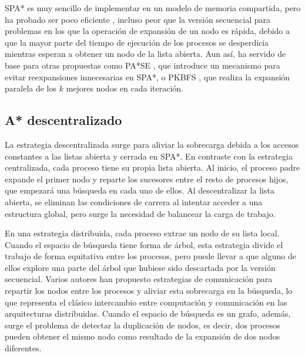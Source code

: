 \documentclass[a4paper,12pt]{article}
\begin{document}
SPA* es muy sencillo de implementar en un modelo de memoria compartida, pero ha probado ser poco eficiente \cite{lai1984anomalies}, incluso peor que la versión secuencial para problemas en los que la operación de expansión de un nodo es rápida, debido a que la mayor parte del tiempo de ejecución de los procesos se desperdicia mientras esperan a obtener un nodo de la lista abierta. Aun así, ha servido de base para otras propuestas como PA*SE \cite{phillips2014pa}, que introduce un mecanismo para evitar reexpansiones innecesarias en SPA*, o PKBFS \cite{vidal2010adaptive}, que realiza la expansión paralela de los $k$ mejores nodos en cada iteración.

\subsection{A* descentralizado} \label{sec:descentralizado}

La estrategia descentralizada surge para aliviar la sobrecarga debida a los accesos constantes a las listas abierta y cerrada en SPA*. En contraste con la estrategia centralizada, cada proceso tiene su propia lista abierta. Al inicio, el proceso padre expande el primer nodo y reparte los sucesores entre el resto de procesos hijos, que empezará una búsqueda en cada uno de ellos. Al descentralizar la lista abierta, se eliminan las condiciones de carrera al intentar acceder a una estructura global, pero surge la necesidad de balancear la carga de trabajo.

En una estrategia distribuida, cada proceso extrae un nodo de su lista local. Cuando el espacio de búsqueda tiene forma de árbol, esta estrategia divide el trabajo de forma equitativa entre los procesos, pero puede llevar a que alguno de ellos explore una parte del árbol que hubiese sido descartada por la versión secuencial. Varios autores han propuesto estrategias de comunicación para repartir los nodos entre los procesos y aliviar esta sobrecarga en la búsqueda, lo que representa el clásico intercambio entre computación y comunicación en las arquitecturas distribuidas. Cuando el espacio de búsqueda es un grafo, además, surge el problema de detectar la duplicación de nodos, es decir, dos procesos pueden obtener el mismo nodo como resultado de la expansión de dos nodos diferentes.

\end{document}
